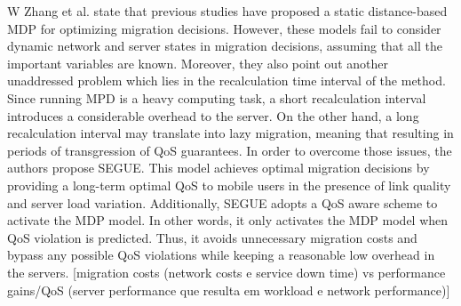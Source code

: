 \noindent\tab W Zhang et al. \cite{zhang2016segue} state that previous studies have proposed a static distance-based MDP for optimizing migration decisions. However, these models fail to consider dynamic network and server states in migration decisions, assuming that all the important variables are known. Moreover, they also point out another unaddressed problem which lies in the recalculation time interval of the method. Since running MPD is a heavy computing task, a short recalculation interval introduces a considerable overhead to the server. On the other hand, a long recalculation interval may translate into lazy migration, meaning that resulting in periods of transgression of QoS guarantees. In order to overcome those issues, the authors propose SEGUE. This model achieves optimal migration decisions by providing a long-term optimal QoS to mobile users in the presence of link quality and server load variation. Additionally, SEGUE adopts a QoS aware scheme to activate the MDP model. In other words, it only activates the MDP model when QoS violation is predicted. Thus, it avoids unnecessary migration costs and bypass any possible QoS violations while keeping a reasonable low overhead in the servers. [migration costs (network costs e service down time) vs performance gains/QoS (server performance que resulta em workload e network performance)]\\
